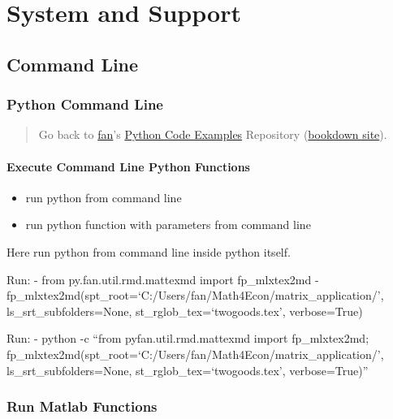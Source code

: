 \documentclass[
]{book}
\providecommand{\tightlist}{%
  \setlength{\itemsep}{0pt}\setlength{\parskip}{0pt}}
\begin{document}
\hypertarget{system-and-support}{%
\chapter{System and Support}\label{system-and-support}}

\hypertarget{command-line}{%
\section{Command Line}\label{command-line}}

\hypertarget{python-command-line}{%
\subsection{Python Command Line}\label{python-command-line}}

\begin{quote}
Go back to \href{http://fanwangecon.github.io/}{fan}'s \href{https://fanwangecon.github.io/pyfan/}{Python Code Examples} Repository (\href{https://fanwangecon.github.io/pyfan/bookdown}{bookdown site}).
\end{quote}

\hypertarget{execute-command-line-python-functions}{%
\subsubsection{Execute Command Line Python Functions}\label{execute-command-line-python-functions}}

\begin{itemize}
\tightlist
\item
  run python from command line
\item
  run python function with parameters from command line
\end{itemize}

Here run python from command line inside python itself.

Run:
- from py.fan.util.rmd.mattexmd import fp\_mlxtex2md
- fp\_mlxtex2md(spt\_root=`C:/Users/fan/Math4Econ/matrix\_application/', ls\_srt\_subfolders=None, st\_rglob\_tex=`twogoods.tex', verbose=True)

Run:
- python -c ``from pyfan.util.rmd.mattexmd import fp\_mlxtex2md; fp\_mlxtex2md(spt\_root=`C:/Users/fan/Math4Econ/matrix\_application/', ls\_srt\_subfolders=None, st\_rglob\_tex=`twogoods.tex', verbose=True)''

\hypertarget{run-matlab-functions}{%
\subsection{Run Matlab Functions}\label{run-matlab-functions}}
\end{document}
